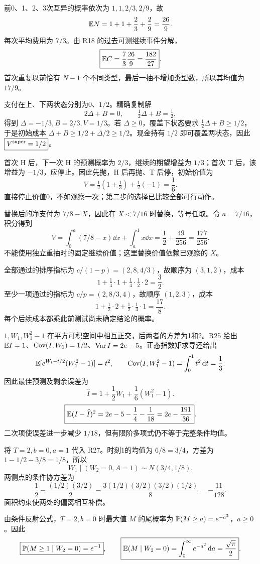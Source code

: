 前0、1、2、3次互异的概率依次为 $1,1,2/3,2/9$，故
\[
 \mathbb{E} N=1+1+\frac23+\frac29=\frac{26}{9}.
\]
每次平均费用为 $7/3$。由 R18 的过去可测继续事件分解，
\[
 \boxed{\mathbb{E} C=\frac73\frac{26}{9}=\frac{182}{27}}.
\]
首次重复以前恰有 $N-1$ 个不同类型，最后一抽不增加类型数，所以其均值为 $\boxed{17/9}$。

支付在上、下两状态分别为0、$1/2$。精确复制解
\[
 2\Delta+B=0,\qquad\tfrac12\Delta+B=\tfrac12,
\]
得到 $\boxed{\Delta=-1/3,B=2/3,V=1/3}$。若 $\Delta\ge0$，覆盖下状态要求 $\tfrac12\Delta+B\ge1/2$，于是初始成本 $\Delta+B\ge1/2+\Delta/2\ge1/2$。现金持有 $1/2$ 即可覆盖两状态，因此 $\boxed{V^{\rm super}=1/2}$。

首次 H 后，下一次 H 的预测概率为 $2/3$，继续的期望增益为 $1/3$；首次 T 后，该增益为 $-1/3$，应停止。因此先抛，H 后再抛、T 后停，初始价值为
\[
 \boxed{V=\tfrac12(1+\tfrac13)+\tfrac12(-1)=\frac16}.
\]
直接停止价值0，不如观察一次；第二步的选择已比较全部可行动作。

替换后的净支付为 $7/8-X$，因此在 $X<7/16$ 时替换，等号任取。令 $a=7/16$，积分得到
\[
 \boxed{V=\int_0^a(7/8-x)\dd x+\int_a^1x\dd x
 =\frac12+\frac{49}{256}=\frac{177}{256}}.
\]
不能使用独立重抽时的固定继续价值；这里替换价值依赖已观察的 $X$。

全部通过的排序指标为 $c/(1-p)=(2,8,4/3)$，故顺序为 $(3,1,2)$，成本
\[
 \boxed{1+\tfrac14\cdot1+\tfrac14\cdot\tfrac12\cdot2=\frac32}.
\]
至少一项通过的指标为 $c/p=(2,8/3,4)$，故顺序 $(1,2,3)$，成本
\[
 \boxed{1+\tfrac12\cdot2+\tfrac12\cdot\tfrac14\cdot1=\frac{17}{8}}.
\]
每个后续成本都乘此前测试尚未确定结论的概率。

$1,W_1,W_1^2-1$ 在平方可积空间中相互正交，后两者的方差为1和2。R25 给出 $\mathbb{E} I=1$、$\operatorname{Cov}(I,W_1)=1/2$、$\operatorname{Var} I=2e-5$。正态指数矩求导还给出
\[
 \mathbb{E}[e^{W_t-t/2}(W_1^2-1)]=t^2,\qquad
 \operatorname{Cov}(I,W_1^2-1)=\int_0^1t^2\,\mathrm{d} t=\frac13.
\]
因此最佳预测及剩余误差为
\[
 \boxed{\widehat I=1+\frac12W_1+\frac16(W_1^2-1)}.
\]
\[
 \boxed{\mathbb{E}(I-\widehat I)^2=2e-5-\frac14-\frac1{18}=2e-\frac{191}{36}}.
\]
二次项使误差进一步减少 $1/18$，但有限阶多项式仍不等于完整条件均值。

将 $T=2,b=0,a=1$ 代入 R27。时刻1的均值为 $6/8=3/4$，方差为 $1-1/2-3/8=1/8$，所以
\[
 \boxed{W_1\mid(W_2=0,A=1)\sim N(3/4,1/8)}.
\]
两侧点的条件协方差为
\[
 \boxed{\frac12-\frac{(1/2)(3/2)}2
 -\frac{3(1/2)(3/2)(3/2)(1/2)}8=-\frac{11}{128}}.
\]
面积约束使两处的偏离相互补偿。

由条件反射公式，$T=2,b=0$ 时最大值 $M$ 的尾概率为 $\mathbb{P}(M\ge a)=e^{-a^2}$，$a\ge0$。因此
\[
 \boxed{\mathbb{P}(M\ge1\mid W_2=0)=e^{-1}},\qquad
 \boxed{\mathbb{E}(M\mid W_2=0)=\int_0^\infty e^{-a^2}\,\mathrm{d} a=\frac{\sqrt\pi}{2}}.
\]

